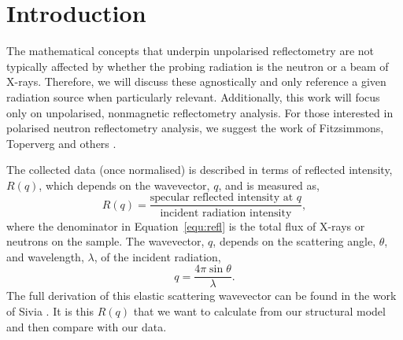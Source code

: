 \documentclass[
 reprint,
 superscriptaddress,
 amsmath,amssymb,
 aps,
]{revtex4-1}
\begin{document}
\maketitle


\section{Introduction}
The mathematical concepts that underpin unpolarised reflectometry are not typically affected by whether the probing radiation is the neutron or a beam of X-rays.
Therefore, we will discuss these agnostically and only reference a given radiation source when particularly relevant.
Additionally, this work will focus only on unpolarised, nonmagnetic reflectometry analysis.
For those interested in polarised neutron reflectometry analysis, we suggest the work of Fitzsimmons, Toperverg and others \cite{fitzsimmons_applications_2005,zabel_polarized_2007,toperberg_neutron_2015}.

The collected data (once normalised) is described in terms of reflected intensity, $R(q)$, which depends on the wavevector, $q$, and is measured as,
%
\begin{equation}
    R(q) = \frac{\text{specular reflected intensity at $q$}}{\text{incident radiation intensity}},
    \label{equ:refl}
\end{equation}
%
where the denominator in Equation~\ref{equ:refl} is the total flux of X-rays or neutrons on the sample.
The wavevector, $q$, depends on the scattering angle, $\theta$, and wavelength, $\lambda$, of the incident radiation, 
%
\begin{equation}
    q = \frac{4\pi\sin{\theta}}{\lambda}.
\end{equation}
%
The full derivation of this elastic scattering wavevector can be found in the work of Sivia \cite{sivia_elementary_2011}. 
It is this $R(q)$ that we want to calculate from our structural model and then compare with our data.
\end{document}
